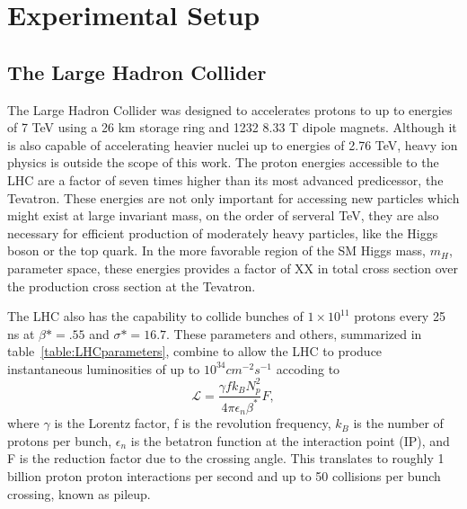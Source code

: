 \newcommand{\microns}{$\mu m$}


\chapter{Experimental Setup}
\label{sec:ExpSetup}


\section{The Large Hadron Collider}
\label{sec:LHC}
The Large Hadron Collider was designed to accelerates protons to up to 
energies of 7 TeV using a 26 km storage ring and  1232  8.33 T dipole magnets. 
Although it is also capable of accelerating heavier nuclei up to energies of 
2.76 TeV, heavy ion physics is outside the scope of this work.  The proton
energies accessible to the LHC are a factor of seven times higher than its
most advanced predicessor, the Tevatron.  These energies are not only 
important for accessing new particles which might exist at large invariant
mass, on the order of serveral TeV, they are also necessary for efficient 
production of moderately heavy particles, like the Higgs boson or the top 
quark.  In the more favorable region of the SM 
Higgs mass,  $m_{H}$, parameter space, these energies provides a 
factor of XX in total cross section over the production cross section at
the Tevatron.  

The LHC also has the capability to collide bunches of $1\times10^{11}$
protons every 25 ns at $\beta*=.55$ and $\sigma*=16.7$.  These
parameters and others, summarized in table~\ref{table:LHCparameters},
combine to allow the LHC to produce instantaneous luminosities 
of up to $10^{34} cm^{-2}s^{-1}$ accoding to
\begin{equation}
\mathscr{L} = \frac{\gamma f k_B N_p^2}{4\pi \epsilon_n\beta^*}F,
\end{equation}
where $\gamma$ is the Lorentz factor, f is the revolution frequency,
$k_B$ is the number of protons per bunch, $\epsilon_n$ is the betatron
function at the interaction point (IP), and F is the reduction factor
due to the crossing angle.  This translates to roughly 1 billion proton
proton interactions per second and up to 50 collisions per bunch crossing, 
known as pileup.  

